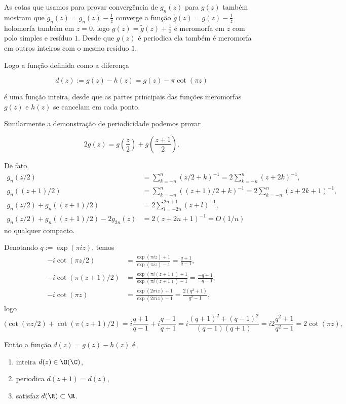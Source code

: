 As cotas que usamos para provar convergência de $g_n(z)$ para $g(z)$ também mostram
que $\tilde{g}_n(z) = g_n(z) - \frac{1}{z}$ converge a função $\tilde{g}(z) = g(z)-\frac{1}{z}$
holomorfa também em $z=0$, logo $g(z) = \tilde{g}(z) + \frac{1}{z}$ é meromorfa em $z$
com polo simples e resíduo $1$. Desde que $g(z)$ é periodica ela também é meromorfa em outros inteiros
com o mesmo resíduo $1$.

Logo a função definida como a diferença

\[ d(z) := g(z) - h(z) = g(z) - \pi \cot(\pi z) \]

é uma função inteira, desde que as partes principais das funções meromorfas $g(z)$ e $h(z)$ se cancelam em cada ponto.


Similarmente a demonstração de periodicidade podemos provar

\[ 2 g(z) = g(\frac{z}{2}) + g(\frac{z+1}{2}). \]

De fato,
\begin{align*}
g_n(z/2) &= \sum_{k=-n}^n (z/2+k)^{-1} = 2 \sum_{k=-n}^n (z+2k)^{-1}, \\
g_n((z+1)/2) &= \sum_{k=-n}^n ((z+1)/2+k)^{-1} = 2 \sum_{k=-n}^n (z+2k+1)^{-1}, \\
g_n(z/2) + g_n((z+1)/2) &= 2 \sum_{l=-2n}^{2n+1} (z+l)^{-1}, \\
g_n(z/2) + g_n((z+1)/2) - 2 g_{2n}(z) &= 2 (z+2n+1)^{-1}  = O(1/n)
\end{align*}
no qualquer compacto.

Denotando $q := \exp(\pi i z)$, temos
\begin{align*}
-i \cot(\pi z/2) &= \frac{\exp(\pi i z)+1}{\exp(\pi i z)-1} = \frac{q+1}{q-1}, \\
-i \cot(\pi (z+1)/2) &= \frac{\exp(\pi i (z+1))+1}{\exp(\pi i (z+1))-1} = \frac{-q+1}{-q-1}, \\
-i \cot(\pi z) &= \frac{\exp(2 \pi i z)+1}{\exp(2 \pi i z)-1} = \frac{2(q^2+1)}{q^2-1},
\end{align*}
logo
\[ (\cot(\pi z/2) + \cot(\pi (z+1)/2)
   = i \frac{q+1}{q-1} + i \frac{q-1}{q+1}
   = i \frac{(q+1)^2+(q-1)^2}{(q-1)(q+1)}
   = i 2 \frac{q^2+1}{q^2-1}
   = 2 \cot(\pi z), \]

Então a função $d(z) = g(z) - h(z)$ é
\begin{enumerate}
\item inteira $d(z) \in \O(\C)$,
\item periodica $d(z+1) = d(z)$,
\item satisfaz $d(\R) \subset \R$.
\end{enumerate}

